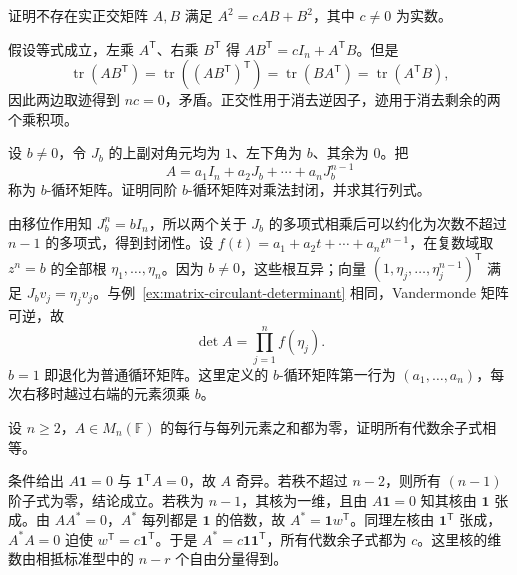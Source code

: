 \begin{example}
\label{ex:matrix-training-orthogonal}
证明不存在实正交矩阵 $A,B$ 满足 $A^2=cAB+B^2$，其中 $c\ne0$ 为实数。
\end{example}
\begin{solve}
假设等式成立，左乘 $A^{\mathsf T}$、右乘 $B^{\mathsf T}$ 得 $AB^{\mathsf T}=cI_n+A^{\mathsf T}B$。但是
\[
 \operatorname{tr}(AB^{\mathsf T})
 =\operatorname{tr}((AB^{\mathsf T})^{\mathsf T})
 =\operatorname{tr}(BA^{\mathsf T})
 =\operatorname{tr}(A^{\mathsf T}B),
\]
因此两边取迹得到 $nc=0$，矛盾。正交性用于消去逆因子，迹用于消去剩余的两个乘积项。
\end{solve}

\begin{example}
\label{ex:matrix-training-b-circulant}
设 $b\ne0$，令 $J_b$ 的上副对角元均为 $1$、左下角为 $b$、其余为 $0$。把
\[
 A=a_1I_n+a_2J_b+\cdots+a_nJ_b^{n-1}
\]
称为 $b$-循环矩阵。证明同阶 $b$-循环矩阵对乘法封闭，并求其行列式。
\end{example}
\begin{solve}
由移位作用知 $J_b^n=bI_n$，所以两个关于 $J_b$ 的多项式相乘后可以约化为次数不超过 $n-1$ 的多项式，得到封闭性。设 $f(t)=a_1+a_2t+\cdots+a_nt^{n-1}$，在复数域取 $z^n=b$ 的全部根 $\eta_1,\ldots,\eta_n$。因为 $b\ne0$，这些根互异；向量 $(1,\eta_j,\ldots,\eta_j^{n-1})^{\mathsf T}$ 满足 $J_bv_j=\eta_jv_j$。与例~\ref{ex:matrix-circulant-determinant} 相同，Vandermonde 矩阵可逆，故
\[
 \det A=\prod_{j=1}^n f(\eta_j).
\]
$b=1$ 即退化为普通循环矩阵。这里定义的 $b$-循环矩阵第一行为 $(a_1,\ldots,a_n)$，每次右移时越过右端的元素须乘 $b$。
\end{solve}

\begin{example}
\label{ex:matrix-training-cofactors-equal}
设 $n\ge2$，$A\in M_n(\mathbb F)$ 的每行与每列元素之和都为零，证明所有代数余子式相等。
\end{example}
\begin{solve}
条件给出 $A\mathbf1=0$ 与 $\mathbf1^{\mathsf T}A=0$，故 $A$ 奇异。若秩不超过 $n-2$，则所有 $(n-1)$ 阶子式为零，结论成立。若秩为 $n-1$，其核为一维，且由 $A\mathbf1=0$ 知其核由 $\mathbf1$ 张成。由 $AA^*=0$，$A^*$ 每列都是 $\mathbf1$ 的倍数，故 $A^*=\mathbf1w^{\mathsf T}$。同理左核由 $\mathbf1^{\mathsf T}$ 张成，$A^*A=0$ 迫使 $w^{\mathsf T}=c\mathbf1^{\mathsf T}$。于是 $A^*=c\mathbf1\mathbf1^{\mathsf T}$，所有代数余子式都为 $c$。这里核的维数由相抵标准型中的 $n-r$ 个自由分量得到。
\end{solve}

